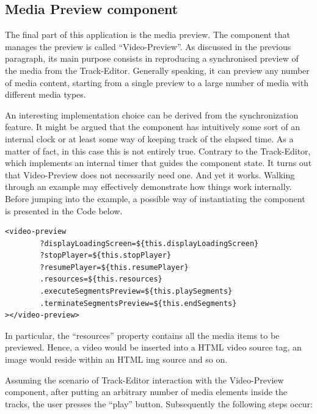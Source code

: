 \subsection{Media Preview component}
\label{subsec:mediaPreview}

The final part of this application is the media preview. The component that manages the preview is called “Video-Preview”. As discussed in the previous paragraph, its main purpose consists in reproducing a synchronised preview of the media from the Track-Editor. Generally speaking, it can preview any number of media content, starting from a single preview to a large number of media with different media types.

An interesting implementation choice can be derived from the synchronization feature. It might be argued that the component has intuitively some sort of an internal clock or at least some way of keeping track of the elapsed time. As a matter of fact, in this case this is not entirely true. Contrary to the Track-Editor, which implements an internal timer that guides the component state. It turns out that Video-Preview does not necessarily need one. And yet it works. Walking through an example may effectively demonstrate how things work internally. Before jumping into the example, a possible way of instantiating the component is presented in the Code below.
\\
\begin{lstlisting}[caption={Video-Preview component instantiation},label={videoPreview}, language=HTML5]
<video-preview
        ?displayLoadingScreen=${this.displayLoadingScreen} 
        ?stopPlayer=${this.stopPlayer}
        ?resumePlayer=${this.resumePlayer}
        .resources=${this.resources}
        .executeSegmentsPreview=${this.playSegments} 
        .terminateSegmentsPreview=${this.endSegments}
></video-preview>
\end{lstlisting}

In particular, the “resources” property contains all the media items to be previewed. Hence, a video would be inserted into a HTML video source tag, an image would reside within an HTML img source and so on.

Assuming the scenario of Track-Editor interaction with the Video-Preview component, after putting an arbitrary number of media elements inside the tracks, the user presses the “play” button. Subsequently the following steps occur:


